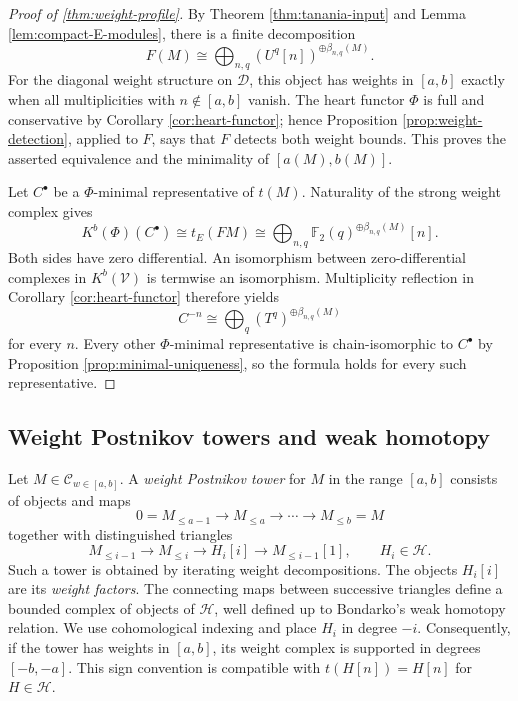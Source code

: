 \documentclass[11pt]{amsart}
\numberwithin{equation}{section}
\theoremstyle{definition}
\theoremstyle{remark}
\newcommand{\F}{\mathbb F_2}
\newcommand{\C}{\mathcal C}
\newcommand{\D}{\mathcal D}
\newcommand{\Hh}{\mathcal H}
\newcommand{\V}{\mathcal V}
\begin{document}
\begin{proof}[Proof of \cref{thm:weight-profile}]
By Theorem \ref{thm:tanania-input} and Lemma \ref{lem:compact-E-modules}, there is a finite
decomposition
\[
  F(M)\cong
  \bigoplus_{n,q}(U^q[n])^{\oplus\beta_{n,q}(M)}.
\]
For the diagonal weight structure on $\D$, this object has weights in
$[a,b]$ exactly when all multiplicities with $n\notin[a,b]$ vanish.  The
heart functor $\Phi$ is full and conservative by Corollary
\ref{cor:heart-functor}; hence Proposition  \ref{prop:weight-detection}, applied to
$F$, says that $F$ detects both weight bounds.  This proves the asserted
equivalence and the minimality of $[a(M),b(M)]$.

Let $C^\bullet$ be a $\Phi$-minimal representative of $t(M)$.  Naturality
of the strong weight complex gives
\[
  K^b(\Phi)(C^\bullet)
  \cong t_E(FM)
  \cong \bigoplus_{n,q}\F(q)^{\oplus\beta_{n,q}(M)}[n].
\]
Both sides have zero differential.  An isomorphism between zero-differential
complexes in $K^b(\V)$ is termwise an isomorphism.  Multiplicity reflection
in Corollary  \ref{cor:heart-functor} therefore yields
\[
  C^{-n}\cong
  \bigoplus_q(T^q)^{\oplus\beta_{n,q}(M)}
\]
for every $n$.  Every other $\Phi$-minimal representative is chain-isomorphic
to $C^\bullet$ by Proposition  \ref{prop:minimal-uniqueness}, so the formula holds for
every such representative.
\end{proof}

\subsection{Weight Postnikov towers and weak homotopy}

Let $M\in\C_{w\in[a,b]}$.  A \emph{weight Postnikov tower} for $M$ in the
range $[a,b]$ consists of objects and maps
\[
  0=M_{\le a-1}\longrightarrow M_{\le a}
  \longrightarrow\cdots\longrightarrow M_{\le b}=M
\]
together with distinguished triangles
\[
  M_{\le i-1}\longrightarrow M_{\le i}
  \longrightarrow H_i[i]\longrightarrow M_{\le i-1}[1],
  \qquad H_i\in\Hh.
\]
Such a tower is obtained by iterating weight decompositions.  The objects
$H_i[i]$ are its \emph{weight factors}.  The connecting maps between
successive triangles define a bounded complex of objects of $\Hh$, well
defined up to Bondarko's weak homotopy relation.  We use cohomological
indexing and place $H_i$ in degree $-i$.  Consequently, if the tower has
weights in $[a,b]$, its weight complex is supported in degrees $[-b,-a]$.
This sign convention is compatible with $t(H[n])=H[n]$ for $H\in\Hh$.
\end{document}
